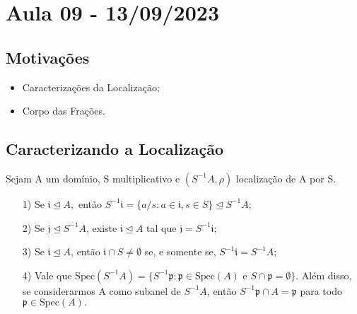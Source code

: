\documentclass[AlgebraII/algebraII_notes.tex]{subfiles}
\begin{document}
\section{Aula 09 - 13/09/2023}
\subsection{Motivações}
\begin{itemize}
	\item Caracterizações da Localização;
	\item Corpo das Frações.
\end{itemize}
\subsection{Caracterizando a Localização}
\begin{prop*}
	Sejam A um domínio, S multiplicativo e \((S^{-1}A, \rho )\) localização de A por S.
	\begin{itemize}
		\item[1)] Se \(\mathfrak{i}\trianglelefteq{A},\) então \(S^{-1}\mathfrak{i} = \{a/s: a\in \mathfrak{i}, s\in S\}\trianglelefteq{S^{-1}A};\)
		\item[2)] Se \(\mathfrak{j}\trianglelefteq{S^{-1}A}\), existe \(\mathfrak{i}\trianglelefteq{A}\) tal que \(\mathfrak{j} = S^{-1}\mathfrak{i};\)
		\item[3)] Se \(\mathfrak{i}\trianglelefteq{A}\), então \(\mathfrak{i}\cap S \neq\emptyset\) se, e somente se, \(S^{-1}\mathfrak{i} = S^{-1}A;\)
		\item[4)] Vale que \(\mathrm{Spec}(S^{-1}A) = \{S^{-1}\mathfrak{p}:\mathfrak{p}\in \mathrm{Spec}(A) \text{ e } S\cap \mathfrak{p}=\emptyset\}\). Além disso, se considerarmos A como subanel de \(S^{-1}A\),
		      então \(S^{-1}\mathfrak{p}\cap A = \mathfrak{p}\) para todo \(\mathfrak{p}\in \mathrm{Spec}(A).\)
	\end{itemize}
\end{prop*}
\end{document}
